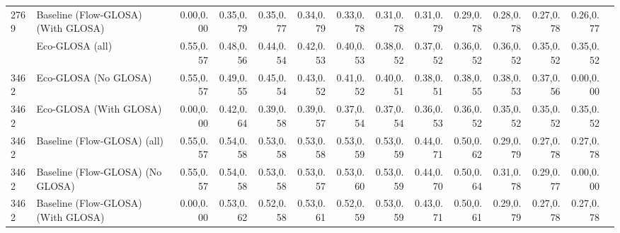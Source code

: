 \begin{table}[ht]
{\begin{tabular}{llrrrrrrrrrrrr}
        2769 & Baseline (Flow-GLOSA) (With GLOSA) & 0.00,0.00 & 0.35,0.79 & 0.35,0.77 & 0.34,0.79 & 0.33,0.78 & 0.31,0.78 & 0.31,0.79 & 0.29,0.78 & 0.28,0.78 & 0.27,0.78 & 0.26,0.77 \\
        \addlinespace
        3462 & Eco-GLOSA (all)                    & 0.55,0.57 & 0.48,0.56 & 0.44,0.54 & 0.42,0.53 & 0.40,0.53 & 0.38,0.52 & 0.37,0.52 & 0.36,0.52 & 0.36,0.52 & 0.35,0.52 & 0.35,0.52 \\
        3462 & Eco-GLOSA (No GLOSA)               & 0.55,0.57 & 0.49,0.55 & 0.45,0.54 & 0.43,0.52 & 0.41,0.52 & 0.40,0.51 & 0.38,0.51 & 0.38,0.55 & 0.38,0.53 & 0.37,0.56 & 0.00,0.00 \\
        3462 & Eco-GLOSA (With GLOSA)             & 0.00,0.00 & 0.42,0.64 & 0.39,0.58 & 0.39,0.57 & 0.37,0.54 & 0.37,0.54 & 0.36,0.53 & 0.36,0.52 & 0.35,0.52 & 0.35,0.52 & 0.35,0.52 \\
        3462 & Baseline (Flow-GLOSA) (all)        & 0.55,0.57 & 0.54,0.58 & 0.53,0.58 & 0.53,0.58 & 0.53,0.59 & 0.53,0.59 & 0.44,0.71 & 0.50,0.62 & 0.29,0.79 & 0.27,0.78 & 0.27,0.78 \\
        3462 & Baseline (Flow-GLOSA) (No GLOSA)   & 0.55,0.57 & 0.54,0.58 & 0.53,0.58 & 0.53,0.57 & 0.53,0.60 & 0.53,0.59 & 0.44,0.70 & 0.50,0.64 & 0.31,0.78 & 0.29,0.77 & 0.00,0.00 \\
        3462 & Baseline (Flow-GLOSA) (With GLOSA) & 0.00,0.00 & 0.53,0.62 & 0.52,0.58 & 0.53,0.61 & 0.52,0.59 & 0.53,0.59 & 0.43,0.71 & 0.50,0.61 & 0.29,0.79 & 0.27,0.78 & 0.27,0.78 \\
        \bottomrule
      \end{tabular}
    }
\end{table}

